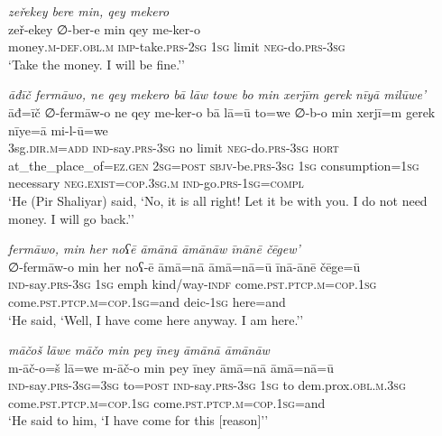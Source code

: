 \ea \label{ŽP.104}
\textit{zeřekey bere min, qey mekero} \\ 
\gll zeř-ekey ∅-ber-e min qey me-ker-o \\ 
 money\textsc{.m}\textsc{-def}\textsc{.obl}\textsc{.m} \textsc{imp-}take\textsc{.prs}-\textsc{2sg} \textsc{1sg} limit \textsc{neg-}do\textsc{.prs}\textsc{-3sg} \\ 
\glt `Take the money. I will be fine.’'
\z 
 
\ea \label{ŽP.105}
\textit{āđīč fermāwo, ne qey mekero bā lāw towe bo min xerjīm gerek nīyā milūwe’} \\ 
\gll āđ=īč ∅-fermāw-o ne qey me-ker-o bā lā=ū to=we ∅-b-o min xerjī=m gerek nīye=ā mi-l-ū=we \\ 
 3sg\textsc{.dir}\textsc{.m}\textsc{=add} \textsc{ind-}say\textsc{.prs}\textsc{-3sg} no limit \textsc{neg-}do\textsc{.prs}\textsc{-3sg} \textsc{hort} at\_the\_place\_of\textsc{\textsc{=ez.gen}} \textsc{2sg}\textsc{=\textsc{post}} \textsc{sbjv-}be\textsc{.prs}\textsc{-3sg} \textsc{1sg} consumption\textsc{=\textsc{1sg}} necessary \textsc{\textsc{neg.}exist}\textsc{=cop}\textsc{.3sg}\textsc{.m} \textsc{ind-}go\textsc{.prs}\textsc{-\textsc{1sg}}\textsc{=compl} \\ 
\glt `He (Pir Shaliyar) said, ‘No, it is all right! Let it be with you. I do not need money. I will go back.’'
\z 
 
\ea \label{ŽP.136}
\textit{fermāwo, min her noʕē āmānā āmānāw īnānē čēgew’} \\ 
\gll ∅-fermāw-o min her noʕ-ē āmā=nā āmā=nā=ū īnā-ānē čēge=ū \\ 
 \textsc{ind-}say\textsc{.prs}\textsc{-3sg} \textsc{1sg} emph kind/way\textsc{-indf} come\textsc{.pst}\textsc{.ptcp}\textsc{.m}\textsc{=cop}\textsc{.\textsc{1sg}} come\textsc{.pst}\textsc{.ptcp}\textsc{.m}\textsc{=cop}\textsc{.\textsc{1sg}}=and deic\textsc{-\textsc{1sg}} here=and \\ 
\glt `He said, ‘Well, I have come here anyway. I am here.’'
\z 
 
\ea \label{ŽP.138}
\textit{māčoš lāwe māčo min pey īney āmānā āmānāw} \\ 
\gll m-āč-o=š lā=we m-āč-o min pey īney āmā=nā āmā=nā=ū \\ 
 \textsc{ind-}say\textsc{.prs}\textsc{-3sg}\textsc{=3sg} to\textsc{=\textsc{post}} \textsc{ind-}say\textsc{.prs}\textsc{-3sg} \textsc{1sg} to dem.prox\textsc{.obl}\textsc{.m}\textsc{.3sg} come\textsc{.pst}\textsc{.ptcp}\textsc{.m}\textsc{=cop}\textsc{.\textsc{1sg}} come\textsc{.pst}\textsc{.ptcp}\textsc{.m}\textsc{=cop}\textsc{.\textsc{1sg}}=and \\ 
\glt `He said to him, ‘I have come for this [reason]’'
\z 
 

